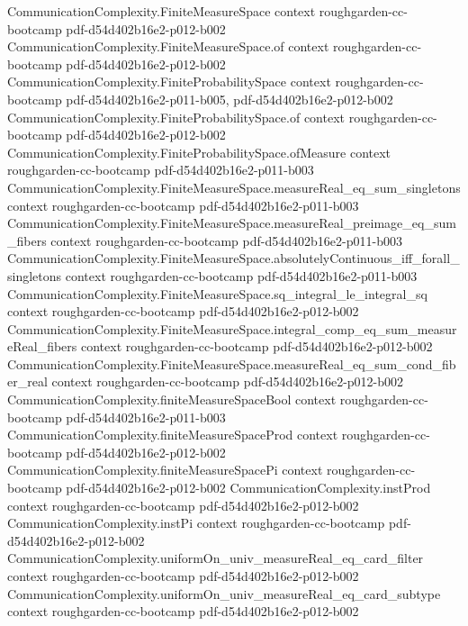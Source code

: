 \begin{theorem}
\proofstep
  {CommunicationComplexity.FiniteMeasureSpace}
  {context}
  {roughgarden-cc-bootcamp}
  {pdf-d54d402b16e2-p012-b002}
\proofstep
  {CommunicationComplexity.FiniteMeasureSpace.of}
  {context}
  {roughgarden-cc-bootcamp}
  {pdf-d54d402b16e2-p012-b002}
\proofstep
  {CommunicationComplexity.FiniteProbabilitySpace}
  {context}
  {roughgarden-cc-bootcamp}
  {pdf-d54d402b16e2-p011-b005,
    pdf-d54d402b16e2-p012-b002}
\proofstep
  {CommunicationComplexity.FiniteProbabilitySpace.of}
  {context}
  {roughgarden-cc-bootcamp}
  {pdf-d54d402b16e2-p012-b002}
\proofstep
  {CommunicationComplexity.FiniteProbabilitySpace.ofMeasure}
  {context}
  {roughgarden-cc-bootcamp}
  {pdf-d54d402b16e2-p011-b003}
\proofstep
  {CommunicationComplexity.FiniteMeasureSpace.measureReal_eq_sum_singletons}
  {context}
  {roughgarden-cc-bootcamp}
  {pdf-d54d402b16e2-p011-b003}
\proofstep
  {CommunicationComplexity.FiniteMeasureSpace.measureReal_preimage_eq_sum_fibers}
  {context}
  {roughgarden-cc-bootcamp}
  {pdf-d54d402b16e2-p011-b003}
\proofstep
  {CommunicationComplexity.FiniteMeasureSpace.absolutelyContinuous_iff_forall_singletons}
  {context}
  {roughgarden-cc-bootcamp}
  {pdf-d54d402b16e2-p011-b003}
\proofstep
  {CommunicationComplexity.FiniteMeasureSpace.sq_integral_le_integral_sq}
  {context}
  {roughgarden-cc-bootcamp}
  {pdf-d54d402b16e2-p012-b002}
\proofstep
  {CommunicationComplexity.FiniteMeasureSpace.integral_comp_eq_sum_measureReal_fibers}
  {context}
  {roughgarden-cc-bootcamp}
  {pdf-d54d402b16e2-p012-b002}
\proofstep
  {CommunicationComplexity.FiniteMeasureSpace.measureReal_eq_sum_cond_fiber_real}
  {context}
  {roughgarden-cc-bootcamp}
  {pdf-d54d402b16e2-p012-b002}
\proofstep
  {CommunicationComplexity.finiteMeasureSpaceBool}
  {context}
  {roughgarden-cc-bootcamp}
  {pdf-d54d402b16e2-p011-b003}
\proofstep
  {CommunicationComplexity.finiteMeasureSpaceProd}
  {context}
  {roughgarden-cc-bootcamp}
  {pdf-d54d402b16e2-p012-b002}
\proofstep
  {CommunicationComplexity.finiteMeasureSpacePi}
  {context}
  {roughgarden-cc-bootcamp}
  {pdf-d54d402b16e2-p012-b002}
\proofstep
  {CommunicationComplexity.instProd}
  {context}
  {roughgarden-cc-bootcamp}
  {pdf-d54d402b16e2-p012-b002}
\proofstep
  {CommunicationComplexity.instPi}
  {context}
  {roughgarden-cc-bootcamp}
  {pdf-d54d402b16e2-p012-b002}
\proofstep
  {CommunicationComplexity.uniformOn_univ_measureReal_eq_card_filter}
  {context}
  {roughgarden-cc-bootcamp}
  {pdf-d54d402b16e2-p012-b002}
\proofstep
  {CommunicationComplexity.uniformOn_univ_measureReal_eq_card_subtype}
  {context}
  {roughgarden-cc-bootcamp}
  {pdf-d54d402b16e2-p012-b002}

\end{theorem}
